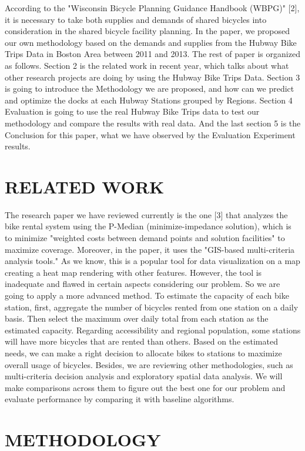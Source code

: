 \documentclass[journal, letterpaper]{IEEEtran}
\begin{document}
According to the "Wisconsin Bicycle Planning Guidance Handbook (WBPG)" [2], it is necessary to take both supplies and demands of shared bicycles into consideration in the shared bicycle facility planning. In the paper, we proposed our own methodology based on the demands and supplies from the Hubway Bike Trips Data in Boston Area between 2011 and 2013. The rest of paper is organized as follows. Section 2 is the related work in recent year, which talks about what other research projects are doing by using the Hubway Bike Trips Data. Section 3 is going to introduce the Methodology we are proposed, and how can we predict and optimize the docks at each Hubway Stations grouped by Regions. Section 4 Evaluation is going to use the real Hubway Bike Trips data to test our methodology and compare the results with real data. And the last section 5 is the Conclusion for this paper, what we have observed by the Evaluation Experiment results. 

\section{RELATED WORK}
\large
The research paper we have reviewed currently is the one [3] that analyzes the bike rental system using the P-Median (minimize-impedance solution), which is to minimize "weighted costs between demand points and solution facilities" to maximize coverage. Moreover, in the paper, it uses the "GIS-based multi-criteria analysis tools." As we know, this is a popular tool for data visualization on a map creating a heat map rendering with other features. However, the tool is inadequate and flawed in certain aspects considering our problem. So we are going to apply a more advanced method. To estimate the capacity of each bike station, first, aggregate the number of bicycles rented from one station on a daily basis. Then select the maximum over daily total from each station as the estimated capacity. Regarding accessibility and regional population, some stations will have more bicycles that are rented than others. Based on the estimated needs, we can make a right decision to allocate bikes to stations to maximize overall usage of bicycles. Besides, we are reviewing other methodologies, such as multi-criteria decision analysis and exploratory spatial data analysis. We will make comparisons across them to figure out the best one for our problem and evaluate performance by comparing it with baseline algorithms.

\section{METHODOLOGY}
\large
\end{document}
